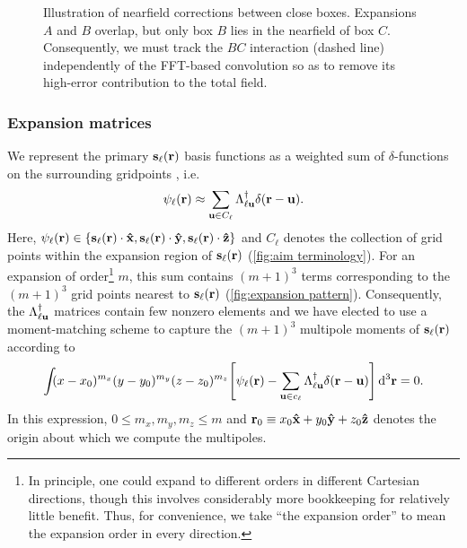 \begin{figure}
  \centering
  \caption{\label{fig:nearfield correction}Illustration of nearfield corrections between close boxes.
    Expansions $A$ and $B$ overlap, but only box $B$ lies in the nearfield of box $C$.
    Consequently, we must track the $BC$ interaction (dashed line) independently of the FFT-based convolution so as to remove its high-error contribution to the total field.
  }
\end{figure}

\subsubsection{Expansion matrices}

We represent the primary $\vb{s}_\ell(\vb{r})$ basis functions as a weighted sum of $\delta$-functions on the surrounding gridpoints , i.e.
\begin{equation}
  \psi_\ell(\vb{r}) \approx \sum_{\vb{u} \in C_\ell} \Lambda_{\ell\vb{u}}^\dagger \delta(\vb{r} - \vb{u}).
  \label{eq:grid linear combination}
\end{equation}
Here, $\psi_\ell(\vb{r}) \in \qty{\vb{s}_\ell(\vb{r})\cdot \vu{x}, \vb{s}_\ell(\vb{r}) \cdot \vu{y}, \vb{s}_\ell(\vb{r}) \cdot \vu{z}}$ and $C_\ell$ denotes the collection of grid points within the expansion region of $\vb{s}_\ell(\vb{r})$ (\cref{fig:aim terminology}).
For an expansion of order\footnote{In principle, one could expand to different orders in different Cartesian directions, though this involves considerably more bookkeeping for relatively little benefit. Thus, for convenience, we take ``the expansion order'' to mean the expansion order in every direction.} $m$, this sum contains $(m + 1)^3$ terms corresponding to the $(m + 1)^3$ grid points nearest to $\vb{s}_\ell(\vb{r})$ (\cref{fig:expansion pattern}).
Consequently, the $\Lambda_{\ell \vb{u}}^\dagger$ matrices contain few nonzero elements and we have elected to use a moment-matching scheme to capture the $(m + 1)^3$ multipole moments of $\vb{s}_\ell(\vb{r})$ according to
\begin{equation}
  \int_{} \kern0.1em (x - x_0)^{m_x}(y - y_0)^{m_y}(z - z_0)^{m_z} \qty[\psi_\ell(\vb{r}) - \sum_{\vb{u} \in c_\ell} \Lambda_{\ell\vb{u}}^\dagger \delta(\vb{r} - \vb{u})] \dd[3]{\vb{r}} = 0.
  \label{eq:moment matching}
\end{equation}
In this expression, $0 \leqslant m_x, m_y, m_z \leqslant m$ and $\vb{r}_0 \equiv x_0 \vu{x} + y_0 \vu{y} + z_0\vu{z}$ denotes the origin about which we compute the multipoles.

